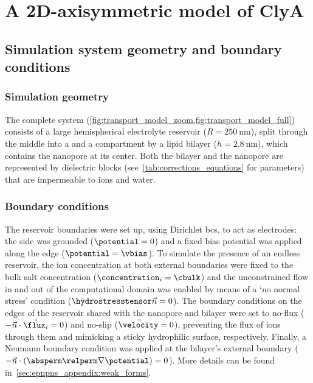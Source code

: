 \section{A 2D-axisymmetric model of {ClyA}}
%
\label{sec:transport:model}
%

\subsection{Simulation system geometry and boundary conditions}
%
\label{sec:transport:global_geometry}
%

\subsubsection{Simulation geometry}
%

The complete system (\cref{fig:transport_model_zoom,fig:transport_model_full}) consists of a large
hemispherical electrolyte reservoir ($R=\SI{250}{\nm}$), split through the middle into a \cisi{} and a
\transi{} compartment by a lipid bilayer ($h=\SI{2.8}{\nm}$), which contains the nanopore at its center. Both
the bilayer and the nanopore are represented by dielectric blocks (see~\cref{tab:corrections_equations} for
parameters) that are impermeable to ions and water.

\subsubsection{Boundary conditions}
%

The reservoir boundaries were set up, using Dirichlet \glspl{bc}, to act as electrodes: the \cisi{} side was
grounded ($\potential = 0$) and a fixed bias potential was applied along the \transi{} edge ($\potential =
\vbias$). To simulate the presence of an endless reservoir, the ion concentration at both external boundaries
were fixed to the bulk salt concentration ($\concentration_i = \cbulk$) and the unconstrained flow in and out
of the computational domain was enabled by means of a `no normal stress' condition ($\hydrostresstensor\vec{n}
= 0$). The boundary conditions on the edges of the reservoir shared with the nanopore and bilayer were set to
no-flux ($-\vec{n}\cdot\vec{\flux}_{i} = 0$) and no-slip ($\vec{\velocity} = 0$), preventing the flux of ions
through them and mimicking a sticky hydrophilic surface, respectively. Finally, a Neumann boundary condition
was applied at the bilayer's external boundary ($-\vec{n}\cdot\left(\absperm \relperm \nabla \potential
\right) = 0$). More details can be found in~\cref{sec:epnpns_appendix:weak_forms}.




